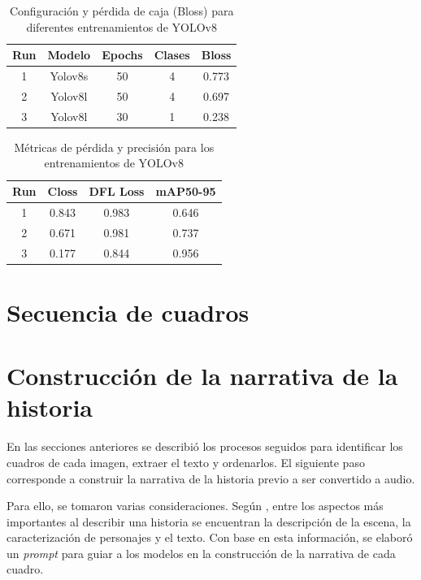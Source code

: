 \documentclass[conference]{IEEEtran}
\begin{document}

\begin{table}[h!]
\centering
\small
\begin{tabular}{|c|c|c|c|c|}
\hline
\textbf{Run} & \textbf{Modelo} & \textbf{Epochs} & \textbf{Clases} & \textbf{Bloss} \\
\hline
1 & Yolov8s & 50 & 4 & 0.773 \\
2 & Yolov8l & 50 & 4 & 0.697 \\
3 & Yolov8l & 30 & 1 & 0.238 \\
\hline
\end{tabular}
\caption{Configuración y pérdida de caja (Bloss) para diferentes entrenamientos de YOLOv8}
\label{tab:yolov8-config}
\end{table}

\begin{table}[h!]
\centering
\small
\begin{tabular}{|c|c|c|c|}
\hline
\textbf{Run} & \textbf{Closs} & \textbf{DFL Loss} & \textbf{mAP50-95} \\
\hline
1 & 0.843 & 0.983 & 0.646 \\
2 & 0.671 & 0.981 & 0.737 \\
3 & 0.177 & 0.844 & 0.956 \\
\hline
\end{tabular}
\caption{Métricas de pérdida y precisión para los entrenamientos de YOLOv8}
\label{tab:yolov8-metrics}
\end{table}

\section{Secuencia de cuadros}

\section{Construcción de la narrativa de la historia}
En las secciones anteriores se describió los procesos seguidos para identificar los cuadros de cada imagen, extraer el texto y ordenarlos. El siguiente paso corresponde a construir la narrativa de la historia previo a ser convertido a audio.

Para ello, se tomaron varias consideraciones. Según \cite{sharma2021accesscomics}, entre los aspectos más importantes al describir una historia se encuentran la descripción de la escena, la caracterización de personajes y el texto. Con base en esta información, se elaboró un \emph{prompt} para guiar a los modelos en la construcción de la narrativa de cada cuadro.
\end{document}
